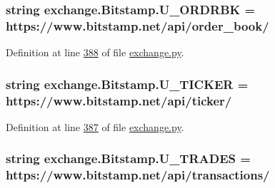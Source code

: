 \subsubsection[{\texorpdfstring{U\+\_\+\+O\+R\+D\+R\+BK}{U_ORDRBK}}]{\setlength{\rightskip}{0pt plus 5cm}string exchange.\+Bitstamp.\+U\+\_\+\+O\+R\+D\+R\+BK = \textquotesingle{}https\+://www.\+bitstamp.\+net/api/order\+\_\+book/\textquotesingle{}\hspace{0.3cm}{\ttfamily [static]}}\hypertarget{classexchange_1_1_bitstamp_ab83fdca31947f7b1a9ff6713945baec0}{}\label{classexchange_1_1_bitstamp_ab83fdca31947f7b1a9ff6713945baec0}


Definition at line \hyperlink{exchange_8py_source_l00388}{388} of file \hyperlink{exchange_8py_source}{exchange.\+py}.

\subsubsection[{\texorpdfstring{U\+\_\+\+T\+I\+C\+K\+ER}{U_TICKER}}]{\setlength{\rightskip}{0pt plus 5cm}string exchange.\+Bitstamp.\+U\+\_\+\+T\+I\+C\+K\+ER = \textquotesingle{}https\+://www.\+bitstamp.\+net/api/{\bf ticker}/\textquotesingle{}\hspace{0.3cm}{\ttfamily [static]}}\hypertarget{classexchange_1_1_bitstamp_ad8453cd76be07bef0001b642e110f981}{}\label{classexchange_1_1_bitstamp_ad8453cd76be07bef0001b642e110f981}


Definition at line \hyperlink{exchange_8py_source_l00387}{387} of file \hyperlink{exchange_8py_source}{exchange.\+py}.

\subsubsection[{\texorpdfstring{U\+\_\+\+T\+R\+A\+D\+ES}{U_TRADES}}]{\setlength{\rightskip}{0pt plus 5cm}string exchange.\+Bitstamp.\+U\+\_\+\+T\+R\+A\+D\+ES = \textquotesingle{}https\+://www.\+bitstamp.\+net/api/transactions/\textquotesingle{}\hspace{0.3cm}{\ttfamily [static]}}\hypertarget{classexchange_1_1_bitstamp_a2424678b2c64d540ce9ecd0af2f96991}{}\label{classexchange_1_1_bitstamp_a2424678b2c64d540ce9ecd0af2f96991}


